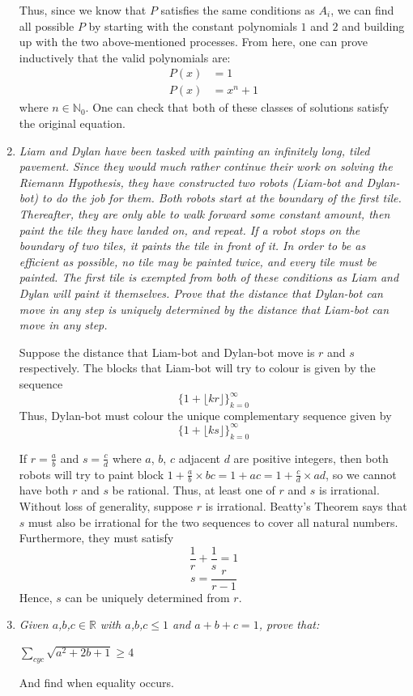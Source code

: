 \documentclass{article}
\begin{document}
\begin{enumerate}
Thus, since we know that $P$ satisfies the same conditions as $A_i$, we can find all possible $P$ by starting with the constant polynomials $1$ and $2$ and building up with the two above-mentioned processes. From here, one can prove inductively that the valid polynomials are:
\begin{align*}
P(x) &= 1\\
P(x) &= x^n + 1
\end{align*}
where $n \in \mathbb{N}_0$. One can check that both of these classes of solutions satisfy the original equation.

\medskip
\item %
{\itshape Liam and Dylan have been tasked with painting an infinitely long, tiled pavement. Since they would much rather continue their work on solving the Riemann Hypothesis, they have constructed two robots (Liam-bot and Dylan-bot) to do the job for them. Both robots start at the boundary of the first tile. Thereafter, they are only able to walk forward some constant amount, then paint the tile they have landed on, and repeat. If a robot stops on the boundary of two tiles, it paints the tile in front of it. In order to be as efficient as possible, no tile may be painted twice, and every tile must be painted. The first tile is exempted from both of these conditions as Liam and Dylan will paint it themselves. Prove that the distance that Dylan-bot can move in any step is uniquely determined by the distance that Liam-bot can move in any step.
}

Suppose the distance that Liam-bot and Dylan-bot move is $r$ and $s$ respectively. The blocks that Liam-bot will try to colour is given by the sequence
$$\{1 + \lfloor kr \rfloor\}_{k=0}^{\infty} $$
Thus, Dylan-bot must colour the unique complementary sequence given by
$$\{1 + \lfloor ks \rfloor\}_{k=0}^{\infty} $$

If $r = \frac{a}{b}$ and $s = \frac{c}{d}$ where $a$, $b$, $c$ adjacent $d$ are positive integers, then both robots will try to paint block $1 + \frac{a}{b} \times bc = 1 + ac = 1 + \frac{c}{d} \times ad$, so we cannot have both $r$ and $s$ be rational. Thus, at least one of $r$ and $s$ is irrational. Without loss of generality, suppose $r$ is irrational. Beatty's Theorem says that $s$ must also be irrational for the two sequences to cover all natural numbers. Furthermore, they must satisfy
$$\frac{1}{r} + \frac{1}{s} = 1$$
$$ s = \frac{r}{r - 1}$$
Hence, $s$ can be uniquely determined from $r$.


\medskip
\item %
{\itshape 
Given $a$,$b$,$c\in\mathbb{R}$ with $a$,$b$,$c\leq 1$ and $a+b+c = 1$, prove that:
\begin{center}
   $\sum_{cyc} \sqrt{a^2+2b+1}\geq 4$ 
\end{center}
And find when equality occurs.}


\end{enumerate}
\end{document}
